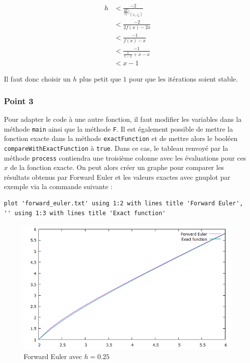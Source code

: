 \begin{equation}
	\begin{aligned}
		h &< \frac{-2}{\frac{\delta F}{\delta f}|_{(x_i, \zeta_i)}}\\
		&< \frac{-2}{2f(x)-2x}\\
		&< \frac{-1}{f(x)-x}\\
		&< \frac{-1}{\frac{1}{1-x}+x-x}\\
		&< x-1
	\end{aligned}
\end{equation}

Il faut donc choisir un $h$ plus petit que $1$ pour que les itérations soient stable.

\subsubsection{Point 3}


Pour adapter le code à une autre fonction, il faut modifier les variables dans la méthode \texttt{main} ainsi que la méthode \texttt{F}. Il est également possible de mettre la fonction exacte dans la méthode \texttt{exactFunction} et de mettre alors le booléen \texttt{compareWithExactFunction} à \texttt{true}. Dans ce cas, le tableau renvoyé par la méthode \texttt{process} contiendra une troisième colonne avec les évaluations pour ces $x$ de la fonction exacte. On peut alors créer un graphe pour comparer les résultats obtenus par Forward Euler et les valeurs exactes avec gnuplot par exemple via la commande suivante :

\begin{lstlisting}
plot 'forward_euler.txt' using 1:2 with lines title 'Forward Euler', '' using 1:3 with lines title 'Exact function'
\end{lstlisting}

\begin{figure}[H]
	\caption{\label{12_forward_1} Forward Euler avec $h=0.25$}
	\centering
	\includegraphics[scale = 0.6]{12_forward_1.png}
\end{figure}


